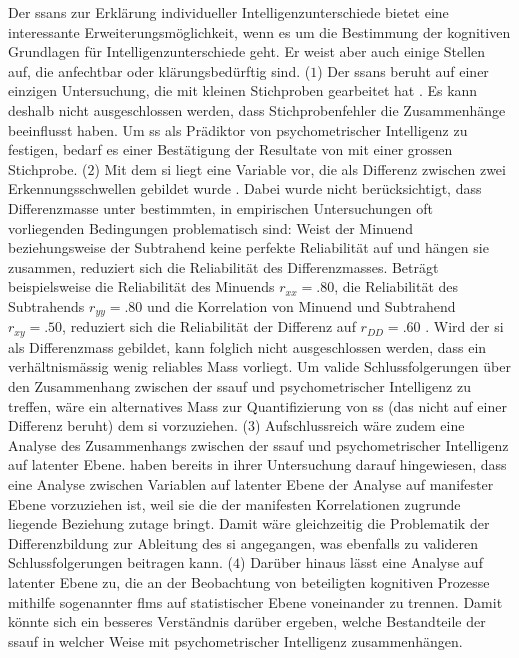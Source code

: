 \documentclass[11pt, twoside, a4paper]{book}		%
\begin{document}
Der \gls{ssans} zur Erklärung individueller Intelligenzunterschiede \citep{Melnick2013} bietet eine interessante Erweiterungsmöglichkeit, wenn es um die Bestimmung der kognitiven Grundlagen für Intelligenzunterschiede geht. Er weist aber auch einige Stellen auf, die anfechtbar oder klärungsbedürftig sind.
($1$) Der \gls{ssans} beruht auf einer einzigen Untersuchung, die mit kleinen Stichproben gearbeitet hat \citep[Studie 1: $N=12$ und Studie 2: $N=53$;][]{Melnick2013}. Es kann deshalb nicht ausgeschlossen werden, dass Stichprobenfehler die Zusammenhänge beeinflusst haben. Um \gls{ss} als Prädiktor von psychometrischer Intelligenz zu festigen, bedarf es einer Bestätigung der Resultate von \citet{Melnick2013} mit einer grossen Stichprobe.
($2$) Mit dem \gls{si} liegt eine Variable vor, die als Differenz zwischen zwei Erkennungsschwellen gebildet wurde \citep{Lappin2009, Melnick2013, Tadin2006, Tadin2011}. Dabei wurde nicht berücksichtigt, dass Differenzmasse unter bestimmten, in empirischen Untersuchungen oft vorliegenden Bedingungen problematisch sind: Weist der Minuend  beziehungsweise der Subtrahend keine perfekte Reliabilität auf und hängen sie zusammen, reduziert sich die Reliabilität des Differenzmasses. Beträgt beispielsweise die Reliabilität des Minuends $r_{xx} = .80$, die Reliabilität des Subtrahends $r_{yy} = .80$ und die Korrelation von Minuend und Subtrahend $r_{xy} = .50$, reduziert sich die Reliabilität der Differenz auf $r_{DD} = .60$ \citep[][S. 145]{Murphy2005}. Wird der \gls{si} als Differenzmass gebildet, kann folglich nicht ausgeschlossen werden, dass ein verhältnismässig wenig reliables Mass vorliegt. Um valide Schlussfolgerungen über den Zusammenhang zwischen der \gls{ssauf} und psychometrischer Intelligenz zu treffen, wäre ein alternatives Mass zur Quantifizierung von \gls{ss} (das nicht auf einer Differenz beruht) dem \gls{si} vorzuziehen.\break
($3$) Aufschlussreich wäre zudem eine Analyse des Zusammenhangs zwischen der \gls{ssauf} und psychometrischer Intelligenz auf latenter Ebene. \citeauthor{Melnick2013} haben bereits in ihrer Untersuchung darauf hingewiesen, dass eine Analyse zwischen Variablen auf latenter Ebene der Analyse auf manifester Ebene vorzuziehen ist, weil sie die der manifesten Korrelationen zugrunde liegende Beziehung zutage bringt. Damit wäre gleichzeitig die Problematik der Differenzbildung zur Ableitung des \gls{si} angegangen, was ebenfalls zu valideren Schlussfolgerungen beitragen kann.\break
($4$) Darüber hinaus lässt eine Analyse auf latenter Ebene zu, die an der Beobachtung von \citeauthor{Melnick2013} beteiligten kognitiven Prozesse mithilfe sogenannter \glspl{flm} \citep[z.~B.][]{Schweizer2006a, Schweizer2006b, Schweizer2007, Schweizer2008, Schweizer2009a} auf statistischer Ebene voneinander zu trennen. Damit könnte sich ein besseres Verständnis darüber ergeben, welche Bestandteile der \gls{ssauf} in welcher Weise mit psychometrischer Intelligenz zusammenhängen.
\end{document}
